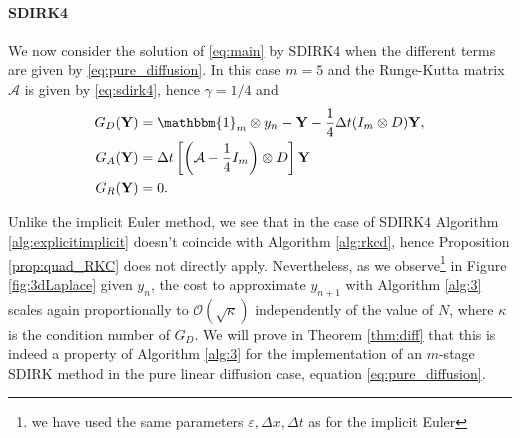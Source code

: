 \documentclass[10pt,a4paper]{article}
\begin{document}
\paragraph{SDIRK4}
We  now consider the solution of \eqref{eq:main} by SDIRK4 when the different terms are given by \eqref{eq:pure_diffusion}. In this case $m=5$ and the Runge-Kutta matrix $\mathcal{A}$ is given by \eqref{eq:sdirk4}, hence $\gamma=1/4$ and
{
\begin{subequations} \label{eq:pure_diffusion_sdirk}
\begin{align} 
G_{D}(\mathbf{Y}) &= \mathbbm{1}_{m}\otimes y_{n}-\mathbf{Y}-\frac{1}{4}\Delta t (I_m \otimes D) \mathbf{Y}, \\ G_{A}(\mathbf{Y})&= \Delta t \left[\left(\mathcal{A}-\frac{1}{4} I_{m} \right)\otimes D \right]\mathbf{Y}   \\ G_{R}(\mathbf{Y})&=0.
\end{align}
\end{subequations}
}

Unlike the implicit Euler method, we see that in the case of SDIRK4 
Algorithm \ref{alg:explicitimplicit}  doesn't coincide with Algorithm 
\ref{alg:rkcd}, hence Proposition \eqref{prop:quad_RKC} does not 
directly apply. Nevertheless,  as we observe\footnote{we have used the 
same parameters $\varepsilon, \Delta x, \Delta t$ as for the implicit 
Euler} in  Figure \ref{fig:3dLaplace} given $y_{n}$, the cost to 
approximate $y_{n+1}$ with Algorithm \ref{alg:3} scales again 
proportionally to $\mathcal{O}(\sqrt{\kappa})$  independently of the 
value of $N$, where $\kappa$ is the condition number of $G_{D}$. We will prove in Theorem \ref{thm:diff} that this is indeed a property of Algorithm \ref{alg:3} for the implementation of an $m$-stage SDIRK method in the pure linear diffusion case, equation \eqref{eq:pure_diffusion}.
\end{document}
